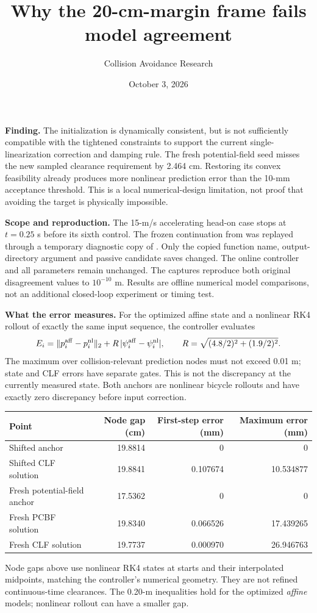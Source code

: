 \documentclass[10pt]{article}
\title{Why the 20-cm-margin frame fails model agreement}
\author{Collision Avoidance Research}
\date{October 3, 2026}
\begin{document}
\maketitle
\textbf{Finding.} The initialization is dynamically consistent, but is not
sufficiently compatible with the tightened constraints to support the current
single-linearization correction and damping rule. The fresh potential-field
seed misses the new sampled clearance requirement by 2.464 cm. Restoring its
convex feasibility already produces more nonlinear prediction error than the
10-mm acceptance threshold. This is a local numerical-design limitation, not
proof that avoiding the target is physically impossible.

\textbf{Scope and reproduction.} The 15-m/s accelerating head-on case stops
at $t=0.25$ s before its sixth control. The frozen continuation from
was replayed through a temporary diagnostic copy of
. Only the copied function name,
output-directory argument and passive candidate saves changed. The online
controller and all parameters remain unchanged. The captures reproduce both
original disagreement values to $10^{-10}$ m. Results are offline numerical
model comparisons, not an additional closed-loop experiment or timing test.

\textbf{What the error measures.} For the optimized affine state and a nonlinear
RK4 rollout of exactly the same input sequence, the controller evaluates
\[
 E_i=\|p_i^{\rm aff}-p_i^{\rm nl}\|_2+
 R\,|\psi_i^{\rm aff}-\psi_i^{\rm nl}|,
 \qquad R=\sqrt{(4.8/2)^2+(1.9/2)^2}.
\]
The maximum over collision-relevant prediction nodes must not exceed 0.01 m;
state and CLF errors have separate gates. This is not the discrepancy at the
currently measured state. Both anchors are nonlinear bicycle rollouts and have
exactly zero discrepancy before input correction.

\begin{center}
\begin{tabular}{lrrr}
\toprule
Point & Node gap (cm) & First-step error (mm) & Maximum error (mm) \\
\midrule
Shifted anchor & 19.8814 & 0 & 0 \\
Shifted CLF solution & 19.8841 & 0.107674 & 10.534877 \\
Fresh potential-field anchor & 17.5362 & 0 & 0 \\
Fresh PCBF solution & 19.8340 & 0.066526 & 17.439265 \\
Fresh CLF solution & 19.7737 & 0.000970 & 26.946763 \\
\bottomrule
\end{tabular}
\end{center}
Node gaps above use nonlinear RK4 states at starts and their interpolated
midpoints, matching the controller's numerical geometry. They are not refined
continuous-time clearances. The 0.20-m inequalities hold for the optimized
\emph{affine} models; nonlinear rollout can have a smaller gap.
\end{document}
